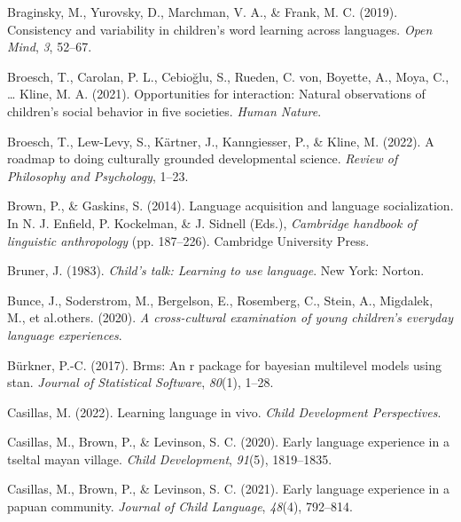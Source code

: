 \documentclass[
  man,floatsintext]{apa6}
\newlength{\cslhangindent}
\newlength{\cslentryspacingunit} %
\newenvironment{CSLReferences}[2] %
 {%
  \setlength{\parindent}{0pt}
  \ifodd #1
  \let\oldpar\par
  \def\par{\hangindent=\cslhangindent\oldpar}
  \fi
  \setlength{\parskip}{#2\cslentryspacingunit}
 }%
 {}
\begin{document}
\begin{CSLReferences}{1}{0}
\leavevmode{}%
Braginsky, M., Yurovsky, D., Marchman, V. A., \& Frank, M. C. (2019). Consistency and variability in children's word learning across languages. \emph{Open Mind}, \emph{3}, 52--67.

\leavevmode{}%
Broesch, T., Carolan, P. L., Cebioğlu, S., Rueden, C. von, Boyette, A., Moya, C., \ldots{} Kline, M. A. (2021). Opportunities for interaction: Natural observations of children's social behavior in five societies. \emph{Human Nature}.

\leavevmode{}%
Broesch, T., Lew-Levy, S., Kärtner, J., Kanngiesser, P., \& Kline, M. (2022). A roadmap to doing culturally grounded developmental science. \emph{Review of Philosophy and Psychology}, 1--23.

\leavevmode{}%
Brown, P., \& Gaskins, S. (2014). Language acquisition and language socialization. In N. J. Enfield, P. Kockelman, \& J. Sidnell (Eds.), \emph{Cambridge handbook of linguistic anthropology} (pp. 187--226). Cambridge University Press.

\leavevmode{}%
Bruner, J. (1983). \emph{Child's talk: Learning to use language}. New York: Norton.

\leavevmode{}%
Bunce, J., Soderstrom, M., Bergelson, E., Rosemberg, C., Stein, A., Migdalek, M., et al.others. (2020). \emph{A cross-cultural examination of young children's everyday language experiences}.

\leavevmode{}%
Bürkner, P.-C. (2017). Brms: An r package for bayesian multilevel models using stan. \emph{Journal of Statistical Software}, \emph{80}(1), 1--28.

\leavevmode{}%
Casillas, M. (2022). Learning language in vivo. \emph{Child Development Perspectives}.

\leavevmode{}%
Casillas, M., Brown, P., \& Levinson, S. C. (2020). Early language experience in a tseltal mayan village. \emph{Child Development}, \emph{91}(5), 1819--1835.

\leavevmode{}%
Casillas, M., Brown, P., \& Levinson, S. C. (2021). Early language experience in a papuan community. \emph{Journal of Child Language}, \emph{48}(4), 792--814.


\end{CSLReferences}
\end{document}
